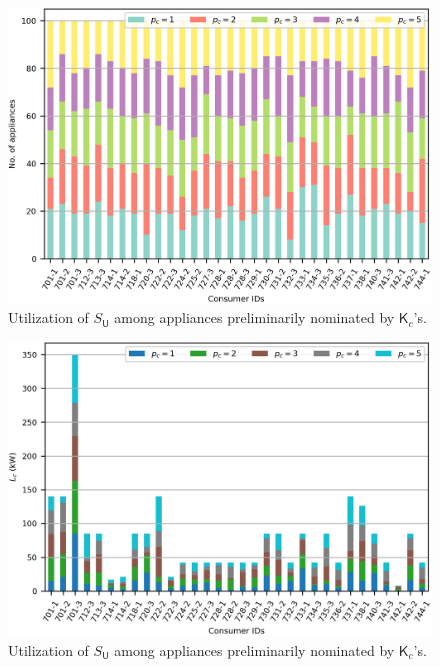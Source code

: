 \documentclass[journal, a4paper]{IEEEtran}
\begin{document}
\begin{figure}[t!]
	\centering
	\includegraphics[scale=1.0]{37NTF-A ACPL}
	\caption{Utilization of $S_{\mathsf{U}}$ among appliances preliminarily nominated by $\mathsf{K}_{c}$'s.}
\end{figure}

\begin{figure}[t!]
	\centering
	\includegraphics[scale=1.0]{37NTF-B TRPL}
	\caption{Utilization of $S_{\mathsf{U}}$ among appliances preliminarily nominated by $\mathsf{K}_{c}$'s.}
\end{figure}
\end{document}
